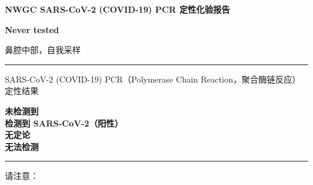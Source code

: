 \documentclass[10pt]{article}
\newcommand{\PageLine}{\rule{\textwidth}{0.25mm}}
\begin{document}
\begin{center}
\Large
\textbf{NWGC SARS-CoV-2 (COVID-19) PCR 定性化验报告}
\end{center}

\bigskip

\begin{description}[font=\normalfont,align=left,labelwidth=8em]
\item [参与者姓名] \textbf{}
\item [出生日期] \textbf{}
\item [样本标识符] \textbf{}
\item [样本提交日期] \textbf{}
\item [结果提供日期]
  \textbf{Never tested}
  \textbf{}
\item [样本类型] 鼻腔中部，自我采样
\end{description}

\PageLine

SARS-CoV-2 (COVID-19) PCR（Polymerase Chain Reaction，聚合酶链反应）定性结果

\textbf{未检测到}\\
\textbf{检测到 SARS-CoV-2（阳性）}\\
\textbf{无定论}\\
\textbf{无法检测}\\

\PageLine

请注意：
\end{document}
